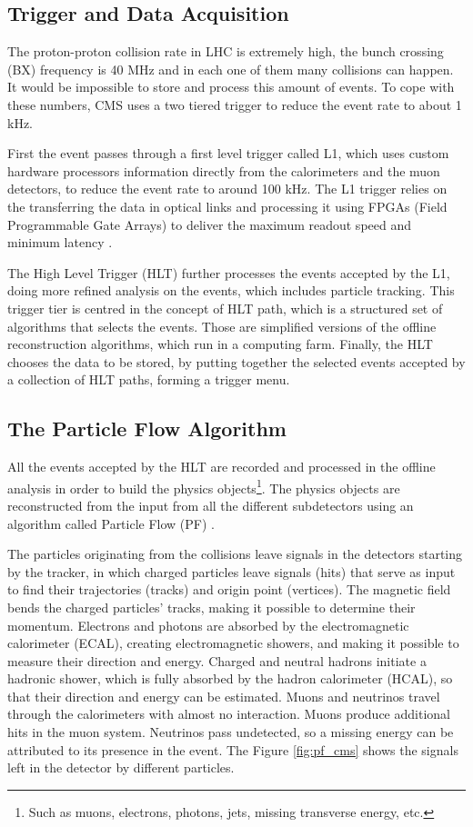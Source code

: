 \subsection{Trigger and Data Acquisition}

The proton-proton collision rate in LHC is extremely high, the bunch crossing (BX) frequency is 40 MHz and in each one of them many collisions can happen. It would be impossible to store and process this amount of events. To cope with these numbers, CMS uses a two tiered trigger to reduce the event rate to about 1 kHz.

First the event passes through a first level trigger called L1, which uses custom hardware processors information directly from the calorimeters and the muon detectors, to reduce the event rate to around 100 kHz. The L1 trigger relies on the transferring the data in optical links and processing it using FPGAs (Field Programmable Gate Arrays) to deliver the maximum readout speed and minimum latency \cite{CMS:2020cmk}.

The High Level Trigger (HLT) further processes the events accepted by the L1, doing more refined analysis on the events, which includes particle tracking. This trigger tier is centred in the concept of HLT path, which is a structured set of algorithms that selects the events. Those are simplified versions of the offline reconstruction algorithms, which run in a computing farm. Finally, the HLT chooses the data to be stored, by putting together the selected events accepted by a collection of HLT paths, forming a trigger menu.

\subsection{The Particle Flow Algorithm}

All the events accepted by the HLT are recorded and processed in the offline analysis in order to build the physics objects\footnote{Such as muons, electrons, photons, jets, missing transverse energy, etc.}. The physics objects are reconstructed from the input from all the different subdetectors using an algorithm called Particle Flow (PF) \cite{CMS:2017yfk}.

The particles originating from the collisions leave signals in the detectors starting by the tracker, in which charged particles leave signals (hits) that serve as input to find their trajectories (tracks) and origin point (vertices). The magnetic field bends the charged particles' tracks, making it possible to determine their momentum. Electrons and photons are absorbed by the electromagnetic calorimeter (ECAL), creating electromagnetic showers, and making it possible to measure their direction and energy. Charged and neutral hadrons initiate a hadronic shower, which is fully absorbed by the hadron calorimeter (HCAL), so that their direction and energy can be estimated. Muons and neutrinos travel through the calorimeters with almost no interaction. Muons produce additional hits in the muon system. Neutrinos pass undetected, so a missing energy can be attributed to its presence in the event. The Figure \ref{fig:pf_cms} shows the signals left in the detector by different particles.

